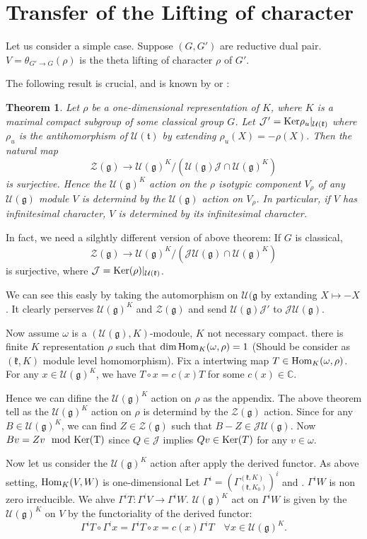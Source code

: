 \documentclass[12pt]{article}
\newtheorem{thm}{Theorem}
\def\Ker{{\rm Ker}}
\def\Hom{{\rm Hom}}
\def\bC{{\mathbb{C}}}
\def\ftt{\mathfrak{t}}
\def\fgg{\mathfrak{g}}
\def\fkk{\mathfrak{k}}
\def\cjj{\mathcal{J}}
\def\cuu{\mathcal{U}}
\def\czz{\mathcal{Z}}
\def\cug{\cuu(\fgg)}
\begin{document}
\section{Transfer of the Lifting of character}
Let us consider a simple case. Suppose $(G,G')$ are reductive dual pair. 
$V = \theta_{G'\to G}(\rho)$ is the theta lifting of character $\rho$ of $G'$.

The following result is crucial, and is known by \cite{Shimura1990} 
or \cite{Zhu2003} :
\begin{thm}
Let $\rho$ be a one-dimensional representation of $K$, where $K$ is a maximal 
compact subgroup of some classical group $G$. Let $\cjj' = \Ker\rho_u|_{\cuu(\fkk)}$ where $\rho_u$ is the antihomorphism of $\cuu(\ftt)$ by extending 
$\rho_u(X) = -\rho(X)$.
Then the natural map
\[
\czz(\fgg) \to \cuu(\fgg)^K/(\cuu(\fgg)\cjj\cap\cuu(\fgg)^K)
\]
is surjective.
Hence the $\cuu(\fgg)^K$ action on the $\rho$ isotypic component $V_\rho$ 
of any $\cuu(\fgg)$ module $V$ is determind by the $\cuu(\fgg)$ action 
on $V_\rho$. In particular, if $V$ has infinitesimal character, 
$V$ is determined by its infinitesimal character.
\end{thm}


In fact, we need a silghtly different version of above theorem:
If $G$ is classical, 
\[
\czz(\fgg)\to \cuu(\fgg)^K/(\cjj\cuu(\fgg)\cap \cuu(\fgg)^K)
\]
is surjective, where $\cjj = \Ker(\rho)|_{\cuu(\fkk)}$.

We can see this easly by taking the automorphism on $\cuu(\fgg$ by 
extanding $X \mapsto -X$. It clearly perserves $\cuu(\fgg)^K$ and
$\czz(\fgg)$ and send $\cuu(\fgg)\cjj'$ to $\cjj\cuu(\fgg)$. 

Now assume $\omega$ is a $(\cuu(\fgg),K)$-modoule, $K$ not necessary compact. 
there is finite $K$ representation $\rho$ such that 
$\dim \Hom_K(\omega, \rho)=1$ (Should be consider as $(\fkk, K)$ 
module level homomorphism). Fix a intertwing map $T\in \Hom_K(\omega, \rho)$.
For any $x\in \cuu(\fgg)^K$, we have $T\circ x = c(x)T$ for some $c(x)\in \bC$. 

Hence we can difine the $\cuu(\fgg)^K$ action on $\rho$ as the appendix. 
The above theorem tell as the $\cuu(\fgg)^K$ action on $\rho$ is determind by 
the $\czz(\fgg)$ action. Since
for any $B\in \cuu(\fgg)^K$, we can find $Z\in \czz(\fgg)$ such that 
$B-Z \in \cjj\cuu(\fgg)$.
Now $Bv = Zv \mod \Ker(T)$ since $Q \in \cjj$ implies $Q v \in \Ker(T)$
for any $v\in \omega$.

Now let us consider the $\cug^K$ action after apply the derived functor. 
As above setting, $\Hom_K(V,W)$ is one-dimensional 
Let $\Gamma^i =\left(\Gamma_{(\fkk,K_0)}^{(\fkk,K)}\right)^i$ and . 
$\Gamma^iW$ is non zero irreducible. 
We ahve $\Gamma^iT \colon \Gamma^iV \to \Gamma^iW$.
$\cug^K$ act on $\Gamma^iW$ is given by the $\cug^K$ 
on $V$ by the functoriality of the derived functor:
\[
\Gamma^i T\circ \Gamma^i x = \Gamma^i T\circ x = c(x)\Gamma^i T \quad
\forall x\in \cug^K.
\]
\end{document}
